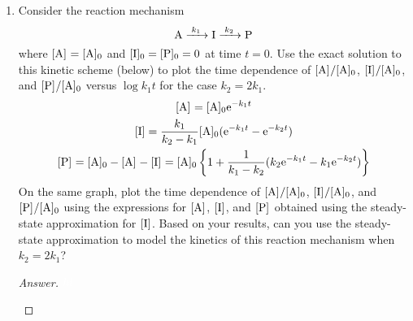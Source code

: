 \documentclass[../psets.tex]{subfiles}
\begin{document}
\begin{enumerate}[label={\textbf{29-\arabic*.}},leftmargin=3.5em]
\begin{proof}[Answer]
        \begin{align*}
            h(x) &= \int_0^xk_2\dd{x}\\
            &= k_2x
        \end{align*}
        and thus that the general solution is
        \begin{align*}
            \cnc{I}\cdot\e[k_2t] &= \int_0^tk_1\cnc[0]{A}\e[-k_1t]\cdot\e[k_2t]\dd{t}\\
            \cnc{I}\e[k_2t] &= k_1\cnc[0]{A}\int_0^t\e[(k_2-k_1)t]\dd{t}\\
            \cnc{I}\e[k_2t] &= \frac{k_1\cnc[0]{A}}{k_2-k_1}\left( \e[(k_2-k_1)t]-1 \right)\\
            [\ce{I}] &= \frac{k_1}{k_2-k_1}\cnc[0]{A}\left( \e[-k_1t]-\e[-k_2t] \right)
        \end{align*}
        as desired.
    \end{proof}
    \item Consider the reaction mechanism
    \begin{equation*}
        \ce{A ->[$k_1$] I ->[$k_2$] P}
    \end{equation*}
    where $\cnc{A}=\cnc[0]{A}$ and $\cnc[0]{I}=\cnc[0]{P}=0$ at time $t=0$. Use the exact solution to this kinetic scheme (below) to plot the time dependence of $\cnc{A}/\cnc[0]{A}$, $\cnc{I}/\cnc[0]{A}$, and $\cnc{P}/\cnc[0]{A}$ versus $\log k_1t$ for the case $k_2=2k_1$.
    \begin{gather*}
        \cnc{A} = \cnc[0]{A}\e[-k_1t]\\
        [\ce{I}] = \frac{k_1}{k_2-k_1}\cnc[0]{A}(\e[-k_1t]-\e[-k_2t])\\
        \cnc{P} = \cnc[0]{A}-\cnc{A}-\cnc{I} = \cnc[0]{A}\left\{ 1+\frac{1}{k_1-k_2}(k_2\e[-k_1t]-k_1\e[-k_2t]) \right\}
    \end{gather*}
    On the same graph, plot the time dependence of $\cnc{A}/\cnc[0]{A}$, $\cnc{I}/\cnc[0]{A}$, and $\cnc{P}/\cnc[0]{A}$ using the expressions for $\cnc{A}$, $\cnc{I}$, and $\cnc{P}$ obtained using the steady-state approximation for $\cnc{I}$. Based on your results, can you use the steady-state approximation to model the kinetics of this reaction mechanism when $k_2=2k_1$?
    \begin{proof}[Answer]
        ${\color{white}hi}$
        \begin{center}
\end{center}
\end{proof}
\end{enumerate}
\end{document}
